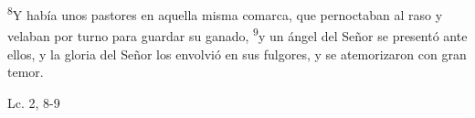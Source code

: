 \documentclass[../../rosario.tex]{subfiles}
\begin{document}
    \textsuperscript{8}Y había unos pastores en aquella misma comarca, que pernoctaban al raso y velaban por turno para guardar su ganado, \textsuperscript{9}y un ángel
    del Señor se presentó ante ellos, y la gloria del Señor los envolvió en sus fulgores, y se atemorizaron con gran temor.
    \begin{flushright}
    Lc. 2, 8-9         
    \end{flushright}
\end{document}
